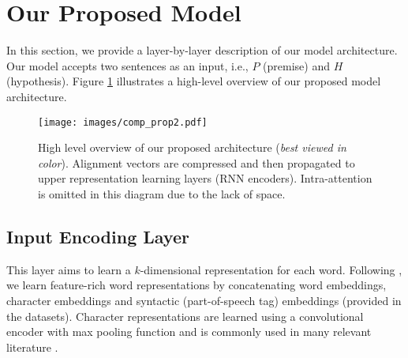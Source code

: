 \documentclass[11pt,a4paper]{article}
\begin{document}
\section{Our Proposed Model}
In this section, we provide a layer-by-layer description of our model architecture. Our model accepts two sentences as an input, i.e., $P$ (premise) and $H$ (hypothesis). Figure \ref{fig:high_level} illustrates a high-level overview of our proposed model architecture.


\begin{figure}[ht]
  \centering
    \texttt{[image: images/comp\_prop2.pdf]}
    \caption{High level overview of our proposed architecture (\textit{best viewed in color}). Alignment vectors are compressed and then propagated to upper representation learning layers (RNN encoders). Intra-attention is omitted in this diagram due to the lack of space. }
    \label{fig:high_level}
\end{figure}


\subsection{Input Encoding Layer}{}
 This layer aims to learn a $k$-dimensional representation for each word. Following \cite{DBLP:journals/corr/abs-1709-04348}, we learn feature-rich word representations by concatenating word embeddings, character embeddings and syntactic (part-of-speech tag) embeddings (provided in the datasets). Character representations are learned using a convolutional encoder with max pooling function and is commonly used in many relevant literature \cite{DBLP:conf/ijcai/WangHF17,DBLP:conf/repeval/ChenZLWJI17}.
\end{document}
